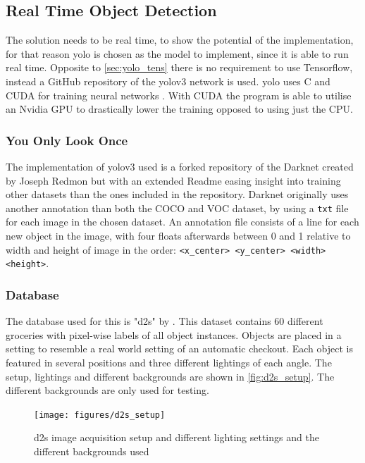 \subsection{Real Time Object Detection}
The solution needs to be real time, to show the potential of the implementation, for that reason \gls{yolo} is chosen as the model to implement, since it is able to run real time. Opposite to \autoref{sec:yolo_tens} there is no requirement to use Tensorflow, instead a GitHub repository of the \gls{yolo}v3 network is used. \gls{yolo} uses C and CUDA for training neural networks \citep{Redmon2018}. With CUDA the program is able to utilise an Nvidia GPU to drastically lower the training opposed to using just the CPU.

\subsubsection{You Only Look Once}
The implementation of \gls{yolo}v3 used is a forked repository of the Darknet created by Joseph Redmon but with an extended Readme easing insight into training other datasets than the ones included in the repository. Darknet originally uses another annotation than both the COCO and VOC dataset, by using a \lstinline|txt| file for each image in the chosen dataset. An annotation file consists of a line for each new object in the image, with four floats afterwards between 0 and 1 relative to width and height of image in the order: \lstinline|<x_center> <y_center> <width> <height>|.

\subsubsection{Database}
The database used for this is "\gls{d2s}" by \cite{d2s}. This dataset contains 60 different groceries with pixel-wise labels of all object instances. Objects are placed in a setting to resemble a real world setting of an automatic checkout. Each object is featured in several positions and three different lightings of each angle. The setup, lightings and different backgrounds are shown in \autoref{fig:d2s_setup}. The different backgrounds are only used for testing.

\begin{figure}[H]
	\centering
	\texttt{[image: figures/d2s\_setup]}
	\caption{\gls{d2s} image acquisition setup and different lighting settings and the different backgrounds used}
	\label{fig:d2s_setup}
\end{figure}

